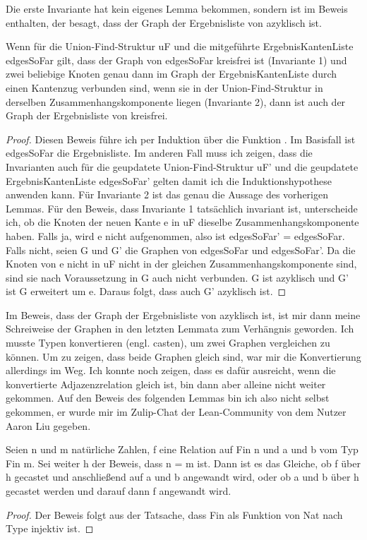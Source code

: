 Die erste Invariante hat kein eigenes Lemma bekommen, sondern ist im Beweis enthalten, der besagt, dass der Graph der Ergebnisliste von \Kruskalkruskalhelper azyklisch ist.

\begin{lemma}[\KruskalkruskalhelperIsAcyclic]
  Wenn für die Union-Find-Struktur uF und die mitgeführte ErgebnisKantenListe edgesSoFar gilt,
  dass der Graph von edgesSoFar kreisfrei ist (Invariante 1)
  und zwei beliebige Knoten genau dann im Graph der ErgebnisKantenListe durch einen Kantenzug verbunden sind,
  wenn sie in der Union-Find-Struktur in derselben Zusammenhangskomponente liegen (Invariante 2),
  dann ist auch der Graph der Ergebnisliste von \Kruskalkruskalhelper kreisfrei.
\end{lemma}
\begin{proof}
  Diesen Beweis führe ich per Induktion über die Funktion \Kruskalkruskalhelper.
  Im Basisfall ist edgesSoFar die Ergebnisliste.
  Im anderen Fall muss ich zeigen, dass die Invarianten auch für die geupdatete Union-Find-Struktur uF' und die geupdatete ErgebnisKantenListe edgesSoFar' gelten
  damit ich die Induktionshypothese anwenden kann.
  Für Invariante 2 ist das genau die Aussage des vorherigen Lemmas.
  Für den Beweis, dass Invariante 1 tatsächlich invariant ist, unterscheide ich, ob die Knoten der neuen Kante e in uF dieselbe Zusammenhangskomponente haben.
  Falls ja, wird e nicht aufgenommen, also ist edgesSoFar' = edgesSoFar.
  Falls nicht, seien G und G' die Graphen von edgesSoFar und edgesSoFar'.
  Da die Knoten von e nicht in uF nicht in der gleichen Zusammenhangskomponente sind, sind sie nach Voraussetzung in G auch nicht verbunden.
  G ist azyklisch und G' ist G erweitert um e.
  Daraus folgt, dass auch G' azyklisch ist.
\end{proof}

Im Beweis, dass der Graph der Ergebnisliste von \Kruskalkruskal azyklisch ist, ist mir dann meine Schreiweise der Graphen in den letzten Lemmata zum Verhängnis geworden.
Ich musste Typen konvertieren (engl. casten), um zwei Graphen vergleichen zu können.
Um zu zeigen, dass beide Graphen gleich sind, war mir die Konvertierung allerdings im Weg.
Ich konnte noch zeigen, dass es dafür ausreicht, wenn die konvertierte Adjazenzrelation gleich ist, bin dann aber alleine nicht weiter gekommen.
Auf den Beweis des folgenden Lemmas bin ich also nicht selbst gekommen, er wurde mir im Zulip-Chat der Lean-Community von dem Nutzer Aaron Liu gegeben.

\begin{lemma}[\KruskalcastFinfun]
  Seien n und m natürliche Zahlen, f eine Relation auf Fin n und a und b vom Typ Fin m.
  Sei weiter h der Beweis, dass n = m ist.
  Dann ist es das Gleiche, ob f über h gecastet und anschließend auf a und b angewandt wird, oder ob a und b über h gecastet werden und darauf dann f angewandt wird.
\end{lemma}
\begin{proof}
  Der Beweis folgt aus der Tatsache, dass Fin als Funktion von Nat nach Type injektiv ist.
\end{proof}



